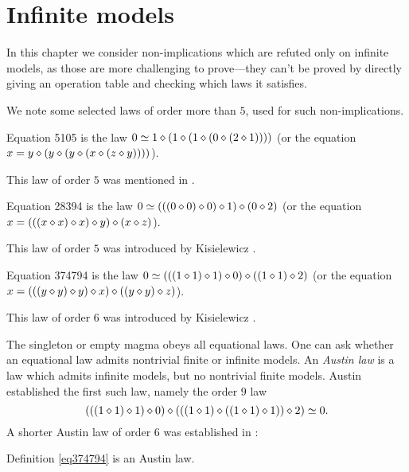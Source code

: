 \chapter{Infinite models}

In this chapter we consider non-implications which are refuted only on infinite models, as those are
more challenging to prove---they can't be proved by directly giving an operation table and checking
which laws it satisfies.

We note some selected laws of order more than $5$, used for such non-implications.

\begin{definition}[Equation 5105]
  \label{eq5105}
  Equation 5105 is the law $0  \simeq 1 \diamond (1 \diamond (1 \diamond (0 \diamond (2 \diamond 1))))$ (or the equation $x = y \diamond (y \diamond (y \diamond (x \diamond (z \diamond y))))$).
\end{definition}

This law of order $5$ was mentioned in \cite{Kisielewicz2}.

\begin{definition}[Equation 28394]
  \label{eq28394}
  Equation 28394 is the law $0  \simeq  (((0 \diamond 0) \diamond 0) \diamond 1) \diamond (0 \diamond 2)$ (or the equation $x = (((x \diamond x) \diamond x) \diamond y) \diamond (x \diamond z)$).
\end{definition}

This law of order $5$ was introduced by Kisielewicz \cite{Kisielewicz}.

\begin{definition}[Equation 374794]
  \leanok
  \label{eq374794}
  Equation 374794 is the law $0  \simeq  (((1 \diamond 1) \diamond 1) \diamond 0) \diamond ((1 \diamond 1) \diamond 2)$ (or the equation $x = (((y \diamond y) \diamond y) \diamond x) \diamond ((y \diamond y) \diamond z)$).
\end{definition}

This law of order $6$ was introduced by Kisielewicz \cite{Kisielewicz}.

The singleton or empty magma obeys all equational laws.  One can ask whether an equational law admits nontrivial finite or infinite models.  An \emph{Austin law} is a law which admits infinite models, but no nontrivial finite models.  Austin \cite{austin} established the first such law, namely the order $9$ law
$$ (((1 \diamond 1) \diamond 1) \diamond 0) \diamond (((1 \diamond 1) \diamond ((1 \diamond 1) \diamond 1)) \diamond 2) \simeq 0.$$
A shorter Austin law of order $6$ was established in \cite{Kisielewicz}:

\begin{theorem}
  \leanok
  \label{kis-thm}
  Definition \ref{eq374794} is an Austin law.
\end{theorem}

